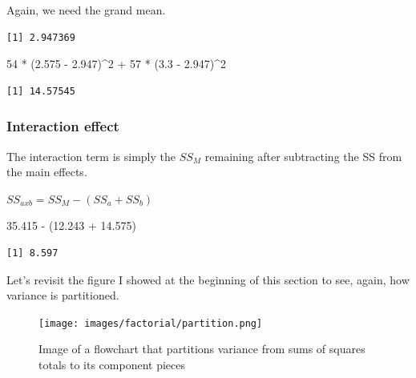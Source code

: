 \documentclass[
  11pt,
]{book}
\newenvironment{Shaded}{\begin{snugshade}}{\end{snugshade}}
\newcommand{\DecValTok}[1]{\textcolor[rgb]{0.00,0.00,0.81}{#1}}
\newcommand{\FloatTok}[1]{\textcolor[rgb]{0.00,0.00,0.81}{#1}}
\newcommand{\FunctionTok}[1]{\textcolor[rgb]{0.00,0.00,0.00}{#1}}
\newcommand{\NormalTok}[1]{#1}
\newcommand{\SpecialCharTok}[1]{\textcolor[rgb]{0.00,0.00,0.00}{#1}}
\begin{document}
Again, we need the grand mean.

\begin{Shaded}
\end{Shaded}

\begin{verbatim}
[1] 2.947369
\end{verbatim}

\begin{Shaded}
\begin{Highlighting}[]
\DecValTok{54} \SpecialCharTok{*}\NormalTok{ (}\FloatTok{2.575} \SpecialCharTok{{-}} \FloatTok{2.947}\NormalTok{)}\SpecialCharTok{\^{}}\DecValTok{2} \SpecialCharTok{+} \DecValTok{57} \SpecialCharTok{*}\NormalTok{ (}\FloatTok{3.3} \SpecialCharTok{{-}} \FloatTok{2.947}\NormalTok{)}\SpecialCharTok{\^{}}\DecValTok{2}
\end{Highlighting}
\end{Shaded}

\begin{verbatim}
[1] 14.57545
\end{verbatim}

\hypertarget{interaction-effect}{%
\subsubsection{Interaction effect}\label{interaction-effect}}

The interaction term is simply the \(SS_M\) remaining after subtracting the SS from the main effects.

\(SS_{axb} = SS_M - (SS_a + SS_b)\)

\begin{Shaded}
\begin{Highlighting}[]
\FloatTok{35.415} \SpecialCharTok{{-}}\NormalTok{ (}\FloatTok{12.243} \SpecialCharTok{+} \FloatTok{14.575}\NormalTok{)}
\end{Highlighting}
\end{Shaded}

\begin{verbatim}
[1] 8.597
\end{verbatim}

Let's revisit the figure I showed at the beginning of this section to see, again, how variance is partitioned.

\begin{figure}
\centering
\texttt{[image: images/factorial/partition.png]}
\caption{Image of a flowchart that partitions variance from sums of squares totals to its component pieces}
\end{figure}
\end{document}
